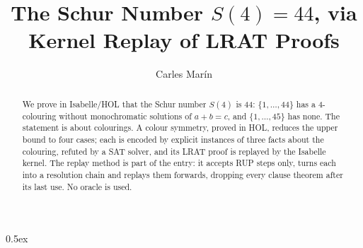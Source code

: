 \documentclass[11pt,a4paper]{article}
\begin{document}
\title{The Schur Number $S(4) = 44$, via Kernel Replay of LRAT Proofs}
\author{Carles Mar\'in}
\maketitle

\begin{abstract}
We prove in Isabelle/HOL that the Schur number $S(4)$ is 44: $\{1,\dots,44\}$ has a 4-colouring without
monochromatic solutions of $a+b=c$, and $\{1,\dots,45\}$ has none. The statement is about colourings. A colour
symmetry, proved in HOL, reduces the upper bound to four cases; each is encoded by explicit instances of three
facts about the colouring, refuted by a SAT solver, and its LRAT proof is replayed by the Isabelle kernel. The
replay method is part of the entry: it accepts RUP steps only, turns each into a resolution chain and replays
them forwards, dropping every clause theorem after its last use. No oracle is used.
\end{abstract}

\tableofcontents

\parindent 0pt\parskip 0.5ex


\end{document}
